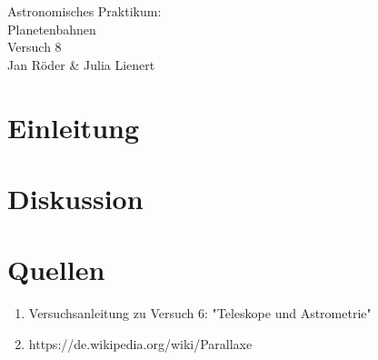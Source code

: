 \documentclass[12pt]{article}
\begin{document}
	\pagestyle{empty}
	

\begin{titlepage}
	\centering
	\bigskip
	\huge{Astronomisches Praktikum:\\Planetenbahnen}\\
	\bigskip
	\large{Versuch 8}\\
	\bigskip
	\large{Jan R\"{o}der \& Julia Lienert}
	\bigskip
	\tableofcontents
\end{titlepage}

\pagebreak


\section{Einleitung}








\section{Diskussion}






\section{Quellen}
\begin{enumerate}
	\item Versuchsanleitung zu Versuch 6: "Teleskope und Astrometrie"
	\item https://de.wikipedia.org/wiki/Parallaxe
\end{enumerate}
\end{document}
